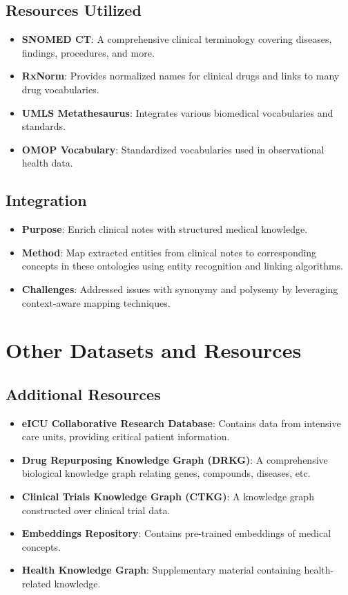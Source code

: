 \documentclass[12pt,a4paper]{report}
\begin{document}
\subsection{Resources Utilized}
\begin{itemize}
    \item \textbf{SNOMED CT}: A comprehensive clinical terminology covering diseases, findings, procedures, and more.
    \item \textbf{RxNorm}: Provides normalized names for clinical drugs and links to many drug vocabularies.
    \item \textbf{UMLS Metathesaurus}: Integrates various biomedical vocabularies and standards.
    \item \textbf{OMOP Vocabulary}: Standardized vocabularies used in observational health data.
\end{itemize}

\subsection{Integration}
\begin{itemize}
    \item \textbf{Purpose}: Enrich clinical notes with structured medical knowledge.
    \item \textbf{Method}: Map extracted entities from clinical notes to corresponding concepts in these ontologies using entity recognition and linking algorithms.
    \item \textbf{Challenges}: Addressed issues with synonymy and polysemy by leveraging context-aware mapping techniques.
\end{itemize}

\section{Other Datasets and Resources}

\subsection{Additional Resources}
\begin{itemize}
    \item \textbf{eICU Collaborative Research Database}: Contains data from intensive care units, providing critical patient information.
    \item \textbf{Drug Repurposing Knowledge Graph (DRKG)}: A comprehensive biological knowledge graph relating genes, compounds, diseases, etc.
    \item \textbf{Clinical Trials Knowledge Graph (CTKG)}: A knowledge graph constructed over clinical trial data.
    \item \textbf{Embeddings Repository}: Contains pre-trained embeddings of medical concepts.
    \item \textbf{Health Knowledge Graph}: Supplementary material containing health-related knowledge.
\end{itemize}
\end{document}
